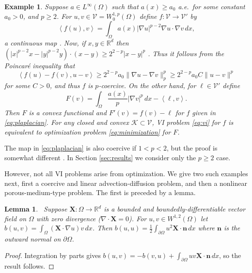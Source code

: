 \documentclass[letterpaper,final,12pt,reqno]{amsart}
\theoremstyle{cstyle}
\newtheorem{lemma}[theorem]{Lemma}
\theoremstyle{cstyle*}
\theoremstyle{dstyle}
\newtheorem{example}[theorem]{Example}
\numberwithin{equation}{section}
\numberwithin{figure}{section}
\numberwithin{table}{section}
\numberwithin{theorem}{section}
\newcommand{\RR}{\mathbb{R}}
\newcommand{\grad}{\nabla}
\newcommand{\Div}{\nabla\cdot}
\newcommand{\bn}{\mathbf{n}}
\newcommand{\bX}{\mathbf{X}}
\newcommand{\cK}{\mathcal{K}}
\newcommand{\cV}{\mathcal{V}}
\newcommand{\ip}[2]{\left<#1,#2\right>}
\begin{document}
\begin{example}  \label{ex:plaplacian}  Suppose $a\in L^\infty(\Omega)$ such that $a(x)\ge a_0$ a.e.~for some constant $a_0>0$, and $p\ge 2$.  For $u,v \in \cV = W^{1,p}_0(\Omega)$ define $f:\cV \to \cV'$ by
\begin{equation}
\ip{f(u)}{v} = \int_\Omega a(x) |\grad u|^{p-2} \grad u \cdot \grad v\,dx, \label{eq:plaplacian}
\end{equation}
a continuous map \cite[Theorem A.0.6]{Peral1997}.  Now, if $x,y\in\RR^d$ then $(|x|^{p-2} x - |y|^{p-2} y)\cdot (x-y) \ge 2^{2-p} |x-y|^p$ \cite[see Appendix A and references therein]{Bueler2021conservation}.  Thus it follows from the Poincar\'e inequality that
    $$\ip{f(u) - f(v)}{u-v} \ge 2^{2-p} a_0 \|\grad u - \grad v\|_p^p \ge 2^{2-p} a_0 C \|u-v\|^p$$
for some $C>0$, and thus $f$ is $p$-coercive.  On the other hand, for $\ell\in\cV'$ define
    $$F(v) = \int_\Omega \frac{a(x)}{p} |\grad v|^p\,dx - \ip{\ell}{v}.$$
Then $F$ is a convex functional and $F'(v) = f(v) - \ell$ for $f$ given in \eqref{eq:plaplacian}.  For any closed and convex $\cK\subset \cV$, VI problem \eqref{eq:vi} for $f$ is equivalent to optimization problem \eqref{eq:minimization} for $F$.\end{example}

The map in \eqref{eq:plaplacian} is also coercive if $1<p<2$, but the proof is somewhat different \cite[Theorem 4.4]{Bueler2021conservation}.  In Section \ref{sec:results} we consider only the $p\ge 2$ case.

However, not all VI problems arise from optimization.  We give two such examples next, first a coercive and linear advection-diffusion problem, and then a nonlinear porous-medium-type problem.  The first is preceded by a lemma.

\begin{lemma}  \label{lem:advectionskew}  \cite{Elmanetal2014}\,  Suppose $\bX :\Omega \to \RR^d$ is a bounded and boundedly-differentiable vector field on $\Omega$ with zero divergence ($\Div \bX=0$).  For $u,v \in W^{1,2}(\Omega)$ let $b(u,v) = \int_\Omega (\bX \cdot \grad u) v\,dx$.  Then $b(u,u) = \frac{1}{2} \int_{\partial \Omega} u^2 \bX\cdot \bn\,dx$ where $\bn$ is the outward normal on $\partial \Omega$.
\end{lemma}

\begin{proof}
Integration by parts gives $b(u,v) = - b(v,u) + \int_{\partial \Omega} uv \bX\cdot \bn\,dx$, so the result follows.
\end{proof}
\end{document}
